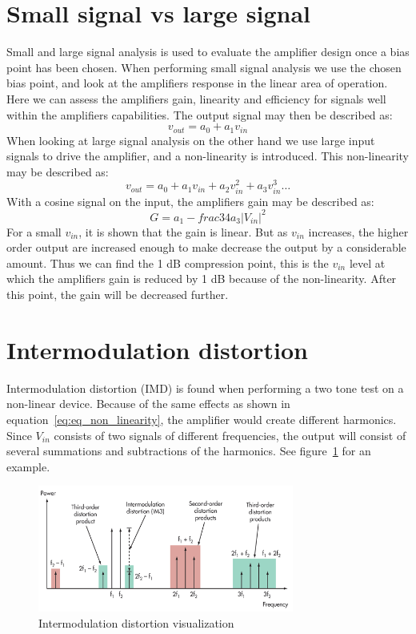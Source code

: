 \section{Small signal vs large signal}
Small and large signal analysis is used to evaluate the amplifier design once a bias point has been chosen. When performing small signal analysis we use the chosen bias point, and look at the amplifiers response in the linear area of operation. Here we can assess the amplifiers gain, linearity and efficiency for signals well within the amplifiers capabilities. The output signal may then be described as:
\begin{equation}
v_{out}=a_0+a_1v_{in}
\end{equation}
When looking at large signal analysis on the other hand we use large input signals to drive the amplifier, and a non-linearity is introduced. This non-linearity may be described as:
\begin{equation}
v_{out}=a_0+a_1v_{in}+a_2v_{in}^2+a_3v_{in}^3 \dots
\label{eq:eq_non_linearity}
\end{equation}
With a cosine signal on the input, the amplifiers gain may be described as:
\begin{equation}
G=a_1-frac{3}{4}a_3|V_{in}|^2
\end{equation}
 For a small $v_{in}$, it is shown that the gain is linear. But as $v_{in}$ increases, the higher order output are increased enough to make decrease the output by a considerable amount. Thus we can find the 1 dB compression point, this is the $v_{in}$ level at which the amplifiers gain is reduced by 1 dB because of the non-linearity. After this point, the gain will be decreased further.

\section{Intermodulation distortion}
Intermodulation distortion (IMD) is found when performing a two tone test on a non-linear device. Because of the same effects as shown in equation~\ref{eq:eq_non_linearity}, the amplifier would create different harmonics. Since $V_{in}$ consists of two signals of different frequencies, the output will consist of several summations and subtractions of the harmonics. See figure~\ref{fig:fig_distortion_vis} for an example.

\begin{figure}[H]
	  \centering
	  \includegraphics[width=0.75\textwidth]{img/Intermodulation_distortion}
	  \caption{Intermodulation distortion visualization}
	  \label{fig:fig_distortion_vis}
\end{figure}
